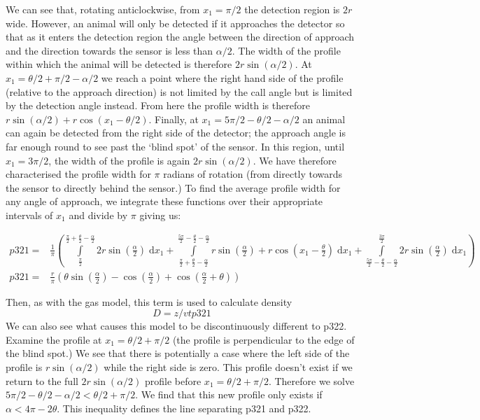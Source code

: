 \documentclass[a4paper,10pt,reqno,oneside]{amsart}
\begin{document}
We can see that, rotating anticlockwise, from $x_1  = \pi/2$ the detection region is $2r$ wide. However, an animal will only be detected if it approaches the detector so that as it enters the detection region the angle between the direction of approach and the direction towards the sensor is less than $\alpha/2$. The width of the profile within which the animal will be detected is therefore $2r\sin(\alpha/2)$. At $x_1  = \theta/2 + \pi/2 - \alpha/2$ we reach a point where the right hand side of the profile (relative to the approach direction) is not limited by the call angle but is limited by the detection angle instead. From here the profile width is therefore $r\sin( \alpha/2) + r\cos( x_1  - \theta/2)$. Finally, at $x_1  = 5\pi/2 - \theta/2  - \alpha/2$ an animal can again be detected from the right side of the detector; the approach angle is far enough round to see past the `blind spot' of the sensor. In this region, until $x_1  = 3\pi/2$, the width of the profile is again $2r\sin( \alpha/2)$. We have therefore characterised the profile width for $\pi$ radians of rotation (from directly towards the sensor to directly behind the sensor.) To find the average profile width for any angle of approach, we integrate these functions over their appropriate intervals of $x_1 $ and divide by $\pi$ giving us:

\begin{align}
    p321 =&\frac{1}{\pi} \left(\int\limits_{\frac{\pi}{2}}^{\frac{\pi}{2} + \frac{\theta}{2} - \frac{\alpha}{2}}2 r \sin{\left (\frac{\alpha}{2} \right )}\;\mathrm{d}x_1+\int\limits_{\frac{\pi}{2} + \frac{\theta}{2} - \frac{\alpha}{2}}^{\frac{5 \pi}{2} - \frac{\theta}{2} - \frac{\alpha}{2}}r \sin{\left (\frac{\alpha}{2} \right )} + r \cos{\left (x_1 - \frac{\theta}{2} \right )}\;\mathrm{d}x_1+\int\limits_{\frac{5 \pi}{2} - \frac{\theta}{2} - \frac{\alpha}{2}}^{\frac{3 \pi}{2}}2 r \sin{\left (\frac{\alpha}{2} \right )}\;\mathrm{d}x_1\right)\\
    p321 =& \frac{r}{\pi} \left(\theta \sin{\left (\frac{\alpha}{2} \right )} - \cos{\left (\frac{\alpha}{2} \right )} + \cos{\left (\frac{\alpha}{2} + \theta \right )}\right) \label{e:p321}
\end{align}

Then, as with the gas model, this term is used to calculate density
\begin{equation}
\label{e:gas}
D = z/vtp321
\end{equation}
We can also see what causes this model to be discontinuously different to p322. Examine the profile at $x_1 = 	\theta/2 + \pi/2$ (the profile is perpendicular to the edge of the blind spot.) We see that there is potentially a case where the left side of the profile is $r\sin( \alpha/2)$ while the right side is zero. This profile doesn't exist if we return to the full $2r\sin( \alpha/2)$ profile before $x_1  = \theta/2 + \pi/2$. Therefore we solve $5\pi/2 - \theta/2 - \alpha/2 <  \theta/2 + \pi/2$. We find that this new profile only exists if $ \alpha < 4\pi - 2 \theta$. This inequality defines the line separating p321 and p322.
\end{document}

